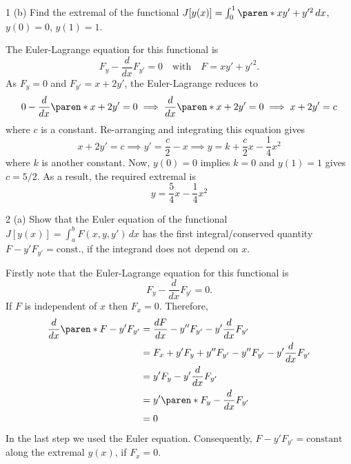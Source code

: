 \documentclass[11pt]{penrose}
\begin{document}
\begin{problem}{1 (b)}
    Find the extremal of the functional $J[y(x)] = \int_0^1 \paren*{xy' + y'^2} \,dx$, $y(0) = 0$, $y(1) = 1$.

    \solution The Euler-Lagrange equation for this functional is
    \begin{equation*}
        F_{y} - \frac{d}{dx}F_{y'}= 0 \quad\text{with}\quad F = xy' + y'^2.
    \end{equation*}
    As $F_{y} = 0$ and $F_{y'} = x + 2y'$, the Euler-Lagrange reduces to
    \begin{equation*}
        0 - \frac{d}{dx}\paren*{x + 2y'}= 0
        \implies
        \frac{d}{dx}\paren*{x + 2y'}= 0
        \implies
        x + 2y' = c
    \end{equation*}
    where $c$ is a constant. Re-arranging and integrating this equation gives
    \begin{equation*}
        x + 2y' = c
        \implies
        y' = \frac{c}{2} - x
        \implies
        y = k + \frac{c}{2}x - \frac{1}{4}x^2
    \end{equation*}
    where $k$ is another constant. Now, $y(0) = 0$ implies $k = 0$ and $y(1) = 1$ gives $c = 5/2$. As a result, the required extremal is
    \begin{equation*}
        y = \frac{5}{4}x - \frac{1}{4}x^2
    \end{equation*}
\end{problem}

\begin{problem}{2 (a)}
    Show that the Euler equation of the functional $J[y(x)] = \int_a^b F(x,y,y') \,dx$ has the first integral/conserved quantity $F - y' F_{y'} = \text{const.}$, if the integrand does not depend on $x$.

    \solution Firstly note that the Euler-Lagrange equation for this functional is
    \begin{equation*}
        F_{y} - \frac{d}{dx}F_{y'} = 0.
    \end{equation*}
    If $F$ is independent of $x$ then $F_x = 0$. Therefore,
    \begin{align*}
        \frac{d}{dx} \paren*{F - y' F_{y'}}
        &= \frac{dF}{dx} - y'' F_{y'} - y' \frac{d}{dx}F_{y'}\\
        &= F_x + y' F_{y} + y'' F_{y'} - y'' F_{y'} - y' \frac{d}{dx}F_{y'}\\
        &= y' F_{y} - y' \frac{d}{dx}F_{y'}\\
        &= y' \paren*{F_{y} - \frac{d}{dx}F_{y'}}\\
        &= 0
    \end{align*}
    In the last step we used the Euler equation. Consequently, $F - y' F_{y'} = \text{constant}$ along the extremal $y(x)$, if $F_x = 0$.
\end{problem}
\end{document}
